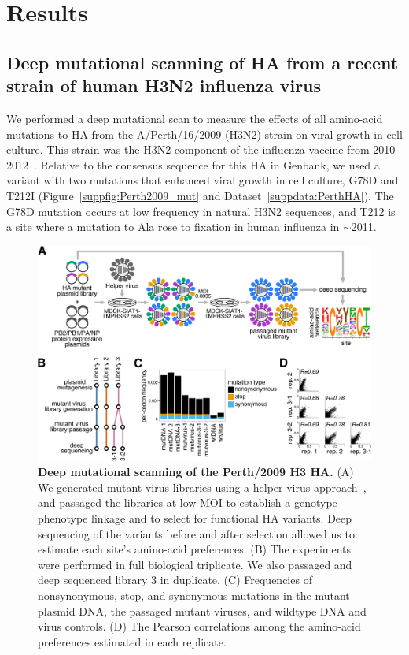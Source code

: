 \documentclass[9pt,twocolumn,twoside]{pnas-new}
\begin{document}
\section*{Results}
\label{sec:results}

\subsection*{Deep mutational scanning of HA from a recent strain of human H3N2 influenza virus}
We performed a deep mutational scan to measure the effects of all amino-acid mutations to HA from the A/Perth/16/2009 (H3N2) strain on viral growth in cell culture. 
This strain was the H3N2 component of the influenza vaccine from 2010-2012~\cite{who2010d,who2011}.
Relative to the consensus sequence for this HA in Genbank, we used a variant with two mutations that enhanced viral growth in cell culture, G78D and T212I (Figure~\ref{suppfig:Perth2009_mut} and Dataset~\ref{suppdata:PerthHA}).
The G78D mutation occurs at low frequency in natural H3N2 sequences, and T212 is a site where a mutation to Ala rose to fixation in human influenza in $\sim$2011.

\begin{figure}
\centering
\includegraphics[width=12cm]{figs/dms_overview/dms_overview.pdf}
\caption{\label{fig:dms_overview}
{\bf Deep mutational scanning of the Perth/2009 H3 HA.}
(A) We generated mutant virus libraries using a helper-virus approach~\cite{doud2016accurate}, and passaged the libraries at low MOI to establish a genotype-phenotype linkage and to select for functional HA variants. 
Deep sequencing of the variants before and after selection allowed us to estimate each site's amino-acid preferences.
(B) The experiments were performed in full biological triplicate. 
We also passaged and deep sequenced library 3 in duplicate.
(C) Frequencies of nonsynonymous, stop, and synonymous mutations in the mutant plasmid DNA, the passaged mutant viruses, and wildtype DNA and virus controls. 
(D) The Pearson correlations among the amino-acid preferences estimated in each replicate. 
}
\end{figure}
\end{document}
